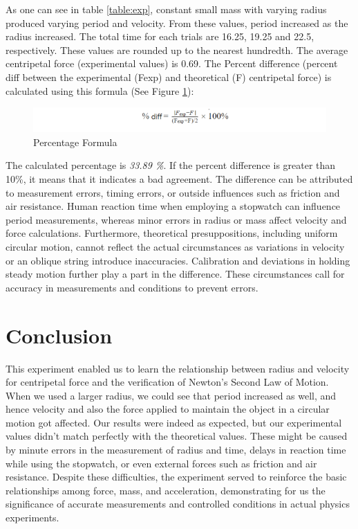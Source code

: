 \documentclass[a4paper,12pt]{article}
\begin{document}
As one can see in table \ref{table:exp}, constant small mass with varying radius produced varying period and velocity. From these values, period increased as the radius increased. The total time for each trials are 16.25, 19.25 and 22.5, respectively. These values are rounded up to the nearest hundredth. The average centripetal force (experimental values) is 0.69. The Percent difference (percent diff between the experimental (Fexp) and theoretical (F) centripetal force) is calculated using this formula (See Figure \ref{fig:percent}):

\begin{figure}[H]
    \centering
    \includegraphics[width=1\textwidth]{percentage.png}
    \caption{Percentage Formula}
    \label{fig:percent}
\end{figure}

The calculated percentage is \textit{33.89 \%}. If the percent difference is greater than 10\%, it means that it indicates a bad agreement. The difference can be attributed to measurement errors, timing errors, or outside influences such as friction and air resistance. Human reaction time when employing a stopwatch can influence period measurements, whereas minor errors in radius or mass affect velocity and force calculations. Furthermore, theoretical presuppositions, including uniform circular motion, cannot reflect the actual circumstances as variations in velocity or an oblique string introduce inaccuracies. Calibration and deviations in holding steady motion further play a part in the difference. These circumstances call for accuracy in measurements and conditions to prevent errors.

\section{Conclusion}

This experiment enabled us to learn the relationship between radius and velocity for centripetal force and the verification of Newton's Second Law of Motion. When we used a larger radius, we could see that period increased as well, and hence velocity and also the force applied to maintain the object in a circular motion got affected. Our results were indeed as expected, but our experimental values didn't match perfectly with the theoretical values. These might be caused by minute errors in the measurement of radius and time, delays in reaction time while using the stopwatch, or even external forces such as friction and air resistance. Despite these difficulties, the experiment served to reinforce the basic relationships among force, mass, and acceleration, demonstrating for us the significance of accurate measurements and controlled conditions in actual physics experiments.


\printbibliography
\end{document}
